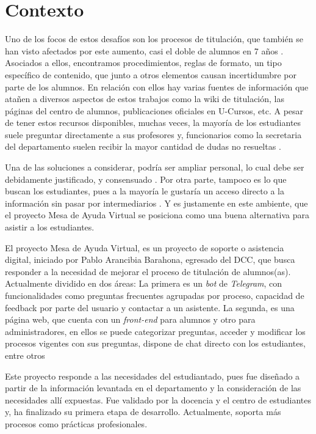 \section{Contexto}\label{sec:intro-con}
    \par Uno de los focos de estos desafíos son los procesos de titulación, que también se han visto afectados por este aumento, casi el doble de alumnos en 7 años \cite{ARANCIBIA2021}. Asociados a ellos, encontramos procedimientos, reglas de formato, un tipo específico de contenido, que junto a otros elementos causan incertidumbre por parte de los alumnos. En relación con ellos hay varias fuentes de información que atañen a diversos aspectos de estos trabajos como la wiki de titulación, las páginas del centro de alumnos, publicaciones oficiales en U-Cursos, etc. A pesar de tener estos recursos disponibles, muchas veces, la mayoría de los estudiantes suele preguntar directamente a sus profesores y, funcionarios como la secretaria del departamento suelen recibir la mayor cantidad de dudas no resueltas \cite{ARANCIBIA2021}.
    \par Una de las soluciones a considerar, podría ser ampliar personal, lo cual debe ser debidamente justificado, y consensuado \cite{Chile2014}. Por otra parte, tampoco es lo que buscan los estudiantes, pues a la mayoría le gustaría un acceso directo a la información sin pasar por intermediarios \cite{ARANCIBIA2021}. Y es justamente en este ambiente, que el proyecto Mesa de Ayuda Virtual se posiciona como una buena alternativa para asistir a los estudiantes.
    \par El proyecto Mesa de Ayuda Virtual, es un proyecto de soporte o asistencia digital, iniciado por Pablo Arancibia Barahona, egresado del DCC, que busca responder a la necesidad de mejorar el proceso de titulación de alumnos(as). Actualmente dividido en dos áreas: La primera es un \textit{bot} de \textit{Telegram}, con funcionalidades como preguntas frecuentes agrupadas por proceso, capacidad de feedback por parte del usuario y contactar a un asistente. La segunda, es una página web, que cuenta con un \textit{front-end} para alumnos y otro para administradores, en ellos se puede categorizar preguntas, acceder y modificar los procesos vigentes con sus preguntas, dispone de chat directo con los estudiantes, entre otros
    \par Este proyecto responde a las necesidades del estudiantado, pues fue diseñado a partir de la información levantada en el departamento y la consideración de las necesidades allí expuestas. Fue validado por la docencia y el centro de estudiantes y, ha finalizado su primera etapa de desarrollo. Actualmente, soporta más procesos como prácticas profesionales.
